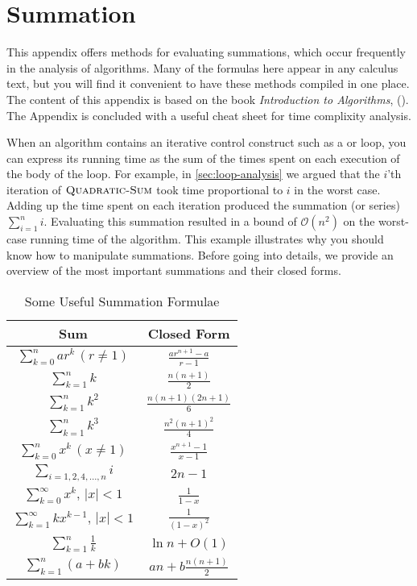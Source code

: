 \chapter{Summation}\label{app:appendix01}

This appendix offers methods for evaluating summations, which occur frequently in the analysis of algorithms. Many
of the formulas here appear in any calculus text, but you will find it convenient to have these methods compiled in one place. The content of this appendix is based on the book \textit{Introduction to Algorithms}, (\cite{clrs4}). The Appendix is concluded with a useful cheat sheet for time complixity analysis.

When an algorithm contains an iterative control construct such as a \While or \For loop, you can express its running time as the sum of the times spent on each execution of the body of the loop. For example, in \autoref{sec:loop-analysis} we argued that the $i$'th iteration of $\proc{Quadratic-Sum}$ took time proportional to $i$ in the worst case. Adding up the time spent on each iteration produced the summation (or series) $\sum\limits_{i=1}^n i$. Evaluating this summation resulted in a bound of $\mathcal{O}(n^2)$ on the worst-case running time of the algorithm. This example illustrates why you should know how to manipulate summations. Before going into details, we provide an overview of the most important summations and their closed forms.

\begin{table}[htbp]
    \centering
    \renewcommand{\arraystretch}{2}
    \begin{tabular}{|c|c|}
    \hline
    \textbf{Sum} & \textbf{Closed Form} \\ \hline
    $\displaystyle \sum_{k=0}^n ar^k \, (r \neq 1)$ & $\displaystyle \frac{ar^{n+1} - a}{r - 1}$ \\ \hline
    $\displaystyle \sum_{k=1}^n k$ & $\displaystyle \frac{n(n+1)}{2}$ \\ \hline
    $\displaystyle \sum_{k=1}^n k^2$ & $\displaystyle \frac{n(n+1)(2n+1)}{6}$ \\ \hline
    $\displaystyle \sum_{k=1}^n k^3$ & $\displaystyle \frac{n^2(n+1)^2}{4}$ \\ \hline
    $\displaystyle \sum_{k=0}^n x^k \, (x \neq 1)$ & $\displaystyle \frac{x^{n+1} - 1}{x - 1}$ \\ \hline
    $\displaystyle \sum_{i=1,2,4,\ldots,n} i$ & $\displaystyle 2n - 1$ \\ \hline
    $\displaystyle \sum_{k=0}^\infty x^k, \, |x| < 1$ & $\displaystyle \frac{1}{1 - x}$ \\ \hline
    $\displaystyle \sum_{k=1}^\infty kx^{k-1}, \, |x| < 1$ & $\displaystyle \frac{1}{(1 - x)^2}$ \\ \hline
    $\displaystyle \sum_{k=1}^n \frac{1}{k}$ & $\displaystyle \ln n + O(1)$ \\ \hline
    $\displaystyle \sum_{k=1}^n (a + bk)$ & $\displaystyle a n + b \frac{n(n+1)}{2}$ \\ \hline  
    \end{tabular}
    \caption{Some Useful Summation Formulae}
\end{table}


